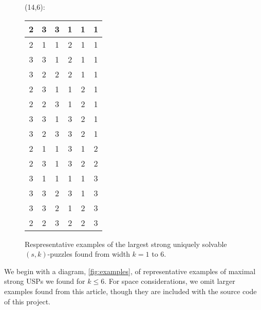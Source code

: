 \documentclass[11pt]{article}
\begin{document}
\begin{figure}
\begin{multicols}{4}
  (14,6):\\[.5ex]
  \begin{tabular}{|c|c|c|c|c|c|}
    \hline
    2&3&3&1&1&1 \\ \hline
    2&1&1&2&1&1 \\ \hline
    3&3&1&2&1&1 \\\hline
    3&2&2&2&1&1 \\\hline
    2&3&1&1&2&1 \\\hline
    2&2&3&1&2&1 \\\hline
    3&3&1&3&2&1 \\\hline
    3&2&3&3&2&1 \\\hline
    2&1&1&3&1&2 \\\hline
    2&3&1&3&2&2 \\\hline
    3&1&1&1&1&3 \\\hline
    3&3&2&3&1&3 \\\hline
    3&3&2&1&2&3 \\\hline
    2&2&3&2&2&3 \\\hline
  \end{tabular}
  \end{multicols}
  \caption{Respresentative examples of the largest strong uniquely
    solvable $(s,k)$-puzzles found from width $k = 1$ to $6$.}
  \label{fig:examples}
\end{figure}

We begin with a diagram, \autoref{fig:examples}, of representative
examples of maximal strong USPs we found for $k \le 6$.  For space
considerations, we omit larger examples found from this article,
though they are included with the source code of this project.
\end{document}
